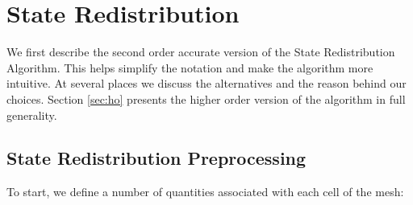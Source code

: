 \section{State Redistribution }\label{sec:srdAlg}

We first describe the second order accurate version of the State
Redistribution Algorithm. 
This helps simplify the notation and make the
algorithm more intuitive.   
At several places we discuss the alternatives and the reason behind our
choices.  
Section \ref{sec:ho} presents the higher order version of the algorithm in full generality.

\subsection{State Redistribution Preprocessing}

To start, we define a number of quantities associated with each cell of the mesh:

